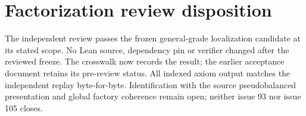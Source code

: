 \documentclass{article}
\begin{document}
\section*{Factorization review disposition}
The independent review passes the frozen general-grade localization candidate at its stated scope. No Lean source, dependency pin or verifier changed after the reviewed freeze. The crosswalk now records the result; the earlier acceptance document retains its pre-review status. All indexed axiom output matches the independent replay byte-for-byte. Identification with the source pseudobalanced presentation and global factory coherence remain open; neither issue 93 nor issue 105 closes.
\end{document}
